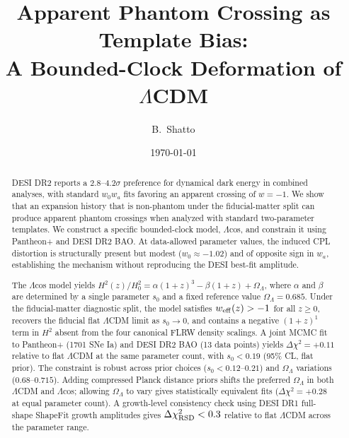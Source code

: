 \documentclass[
  aps,
  prd,
  onecolumn,         %
  nofootinbib,
  longbibliography
]{revtex4-2}
\begin{document}
\title{Apparent Phantom Crossing as Template Bias: \\
       A Bounded-Clock Deformation of $\Lambda$CDM}

\author{B.~Shatto}

\date{\today}

\begin{abstract}
DESI DR2 reports a 2.8--4.2$\sigma$ preference for dynamical dark energy in combined analyses, with standard $w_0 w_a$ fits favoring an apparent crossing of $w = -1$. We show that an expansion history that is non-phantom under the fiducial-matter split can produce apparent phantom crossings when analyzed with standard two-parameter templates. We construct a specific bounded-clock model, $\Lambda$cos, and constrain it using Pantheon+ and DESI DR2 BAO. At data-allowed parameter values, the induced CPL distortion is structurally present but modest ($w_0 \approx -1.02$) and of opposite sign in $w_a$, establishing the mechanism without reproducing the DESI best-fit amplitude.

The $\Lambda$cos model yields $H^2(z)/H_0^2 = \alpha(1+z)^3 - \beta(1+z) + \Omega_\Lambda$, where $\alpha$ and $\beta$ are determined by a single parameter $s_0$ and a fixed reference value $\Omega_\Lambda = 0.685$. Under the fiducial-matter diagnostic split, the model satisfies $w_{\rm eff}(z) > -1$ for all $z \geq 0$, recovers the fiducial flat $\Lambda$CDM limit as $s_0 \to 0$, and contains a negative $(1+z)^1$ term in $H^2$ absent from the four canonical FLRW density scalings. A joint MCMC fit to Pantheon+ (1701 SNe Ia) and DESI DR2 BAO (13 data points) yields $\Delta\chi^2 = +0.11$ relative to flat $\Lambda$CDM at the same parameter count, with $s_0 < 0.19$ (95\% CL, flat prior). The constraint is robust across prior choices ($s_0 < 0.12$--$0.21$) and $\Omega_\Lambda$ variations ($0.68$--$0.715$). Adding compressed Planck distance priors shifts the preferred $\Omega_\Lambda$ in both $\Lambda$CDM and $\Lambda$cos; allowing $\Omega_\Lambda$ to vary gives statistically equivalent fits ($\Delta\chi^2 = +0.28$ at equal parameter count). A growth-level consistency check using DESI DR1 full-shape ShapeFit growth amplitudes gives $\Delta\chi^2_{\rm RSD} < 0.3$ relative to flat $\Lambda$CDM across the parameter range.
\end{abstract}

\maketitle
\end{document}
